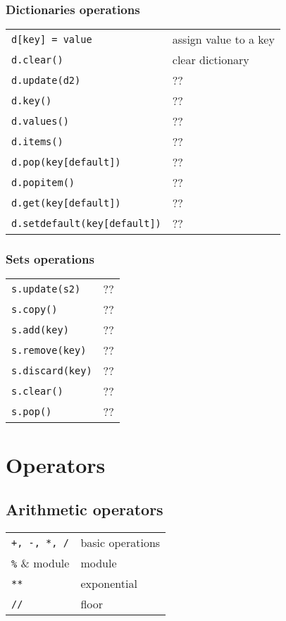 \subsubsection{Dictionaries operations}
\begin{tabular}{@{}ll@{}}
    \verb!d[key] = value!    & assign value to a key \\
    \verb!d.clear()!    & clear dictionary \\
    \verb!d.update(d2)!    & ?? \\
    \verb!d.key()!    & ?? \\
    \verb!d.values()!    & ?? \\
    \verb!d.items()!    & ?? \\
    \verb!d.pop(key[default])!    & ?? \\
    \verb!d.popitem()!    & ?? \\
    \verb!d.get(key[default])!    & ?? \\
    \verb!d.setdefault(key[default])!    & ?? \\
\end{tabular}


\subsubsection{Sets operations}
\begin{tabular}{@{}ll@{}}
    \verb!s.update(s2)!    & ?? \\
    \verb!s.copy()!    & ?? \\
    \verb!s.add(key)!    & ?? \\
    \verb!s.remove(key)!    & ?? \\
    \verb!s.discard(key)!    & ?? \\
    \verb!s.clear()!    & ?? \\
    \verb!s.pop()!    & ?? \\
\end{tabular}






\section{Operators}

    \subsection{Arithmetic operators}
        \begin{tabular}{@{}ll@{}}
            \verb!+, -, *, /!    & basic operations \\
            \verb!%!     & module \\
            \verb!**!      & exponential \\
            \verb!//!      & floor \\
        \end{tabular}
        
